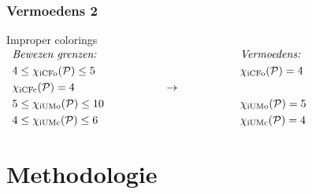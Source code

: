 \documentclass
[kulak] %
{kulakbeamer}
\begin{document}
	\begin{frame}
		\frametitle{Vermoedens 2}
		\setcounter{footnote}{3} 
		\begin{block}{Improper colorings}
			$
			\begin{array}{c@{\hspace{2cm}}c@{\hspace{2cm}}c}
				\begin{aligned}
					& \textit{Bewezen grenzen:} \\
					& 4 \le \chi_{\mathrm{iCFo}}(\mathcal{P}) \le 5 \\ 
					& \chi_{\mathrm{iCFc}}(\mathcal{P}) = 4 \\ 
					& 5 \le \chi_{\mathrm{iUMo}}(\mathcal{P}) \le 10 \\ 
					&4 \le \chi_{\mathrm{iUMc}}(\mathcal{P}) \le 6
				\end{aligned}
				&
				\Large \rightarrow
				&
				\begin{aligned}
					& \textit{Vermoedens:} \\
					& \chi_{\mathrm{iCFo}}(\mathcal{P}) = 4 \\ 
					&  \\ 
					& \chi_{\mathrm{iUMo}}(\mathcal{P}) = 5 \\ 
					& \chi_{\mathrm{iUMc}}(\mathcal{P}) = 4
				\end{aligned}
			\end{array}
			$
		\end{block}
		
		
	\end{frame}

	
	\section{Methodologie}
	
\end{document}
